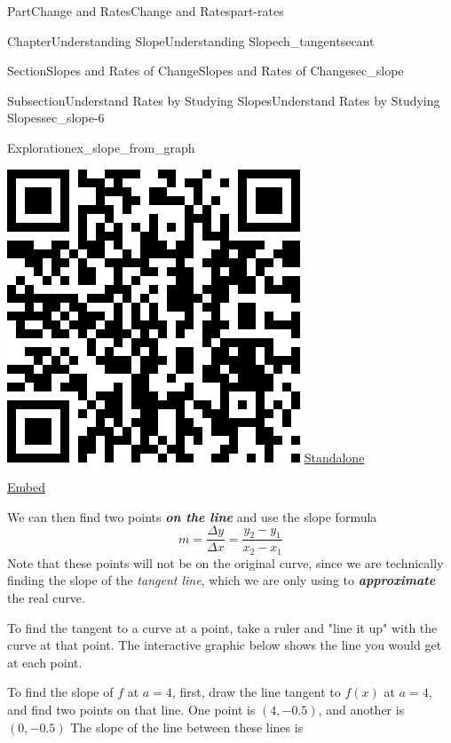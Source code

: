 \documentclass{tufte-book}
\newcommand{\alert}[1]{\textbf{\textit{#1}}}
\numberwithin{equation}{chapter}
\begin{document}
\begin{partptx}{Part}{Change and Rates}{}{Change and Rates}{}{}{part-rates}
\begin{chapterptx}{Chapter}{Understanding Slope}{}{Understanding Slope}{}{}{ch_tangentsecant}
\begin{sectionptx}{Section}{Slopes and Rates of Change}{}{Slopes and Rates of Change}{}{}{sec_slope}
\begin{subsectionptx}{Subsection}{Understand Rates by Studying Slopes}{}{Understand Rates by Studying Slopes}{}{}{sec_slope-6}
\begin{exploration}{Exploration}{}{ex_slope_from_graph}
\begin{enumerate}[font=\bfseries,label=(\alph*),ref=\alph*]
\begin{sidebyside}{2}{0.075}{0.075}{0.17}
\begin{sbspanel}{0.21}
\includegraphics[width=\linewidth]{generated/qrcode/ex_slope_from_graph-5-2-2.png}
\href{http://webwork.bridgew.edu/oer/functions_at_work/ex_slope_from_graph-5-2-2.html}{Standalone}%
\par
\href{http://webwork.bridgew.edu/oer/functions_at_work/ex_slope_from_graph-5-2-2-if.html}{Embed}%
\end{sbspanel}%
\end{sidebyside}%
\par
We can then find two points \alert{on the line} and use the slope formula%
\begin{equation*}
m = \dfrac{\Delta y}{\Delta x} = \dfrac{y_2-y_1}{x_2-x_1}
\end{equation*}
Note that these points will not be on the original curve, since we are technically finding the slope of the \emph{tangent line}, which we are only using to \alert{approximate} the real curve.%
\par
To find the tangent to a curve at a point, take a ruler and "line it up" with the curve at that point. The interactive graphic below shows the line you would get at each point.%
\par
To find the slope of \(f\) at \(a=4\), first, draw the line tangent to \(f(x)\) at \(a=4\), and find two points on that line. One point is \((4,-0.5)\), and another is \((0,-0.5)\) The slope of the line between these lines is%

\end{enumerate}
\end{exploration}
\end{subsectionptx}
\end{sectionptx}
\end{chapterptx}
\end{partptx}
\end{document}
